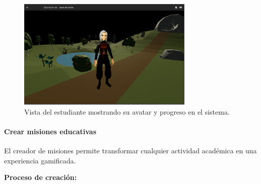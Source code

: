 \begin{figure}[H]
	\centering
	\includegraphics[width=0.75\textwidth]{images/pagina_web_vista-alumno.png}
	\caption{Vista del estudiante mostrando su avatar y progreso en el sistema.}
	\label{fig:manual-vista-alumno}
\end{figure}

\paragraph{Crear misiones educativas}

El creador de misiones permite transformar cualquier actividad académica en una experiencia gamificada.

\textbf{Proceso de creación:}

